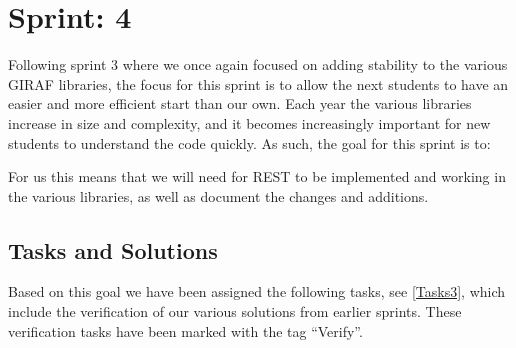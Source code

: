 \chapter{Sprint: 4}

Following sprint 3 where we once again focused on adding stability to the
various GIRAF libraries, the focus for this sprint is to allow the next students
to have an easier and more efficient start than our own. Each year the various
libraries increase in size and complexity, and it becomes increasingly
important for new students to understand the code quickly. As such, the goal
for this sprint is to:

\nl

For us this means that we will need for REST to be implemented and working
in the various libraries, as well as document the changes and additions.


\section{Tasks and Solutions}

Based on this goal we have been assigned the following tasks, see
\autoref{Tasks3}, which include the verification of our various solutions from
earlier sprints. These verification tasks have been marked with the tag
``Verify''.

